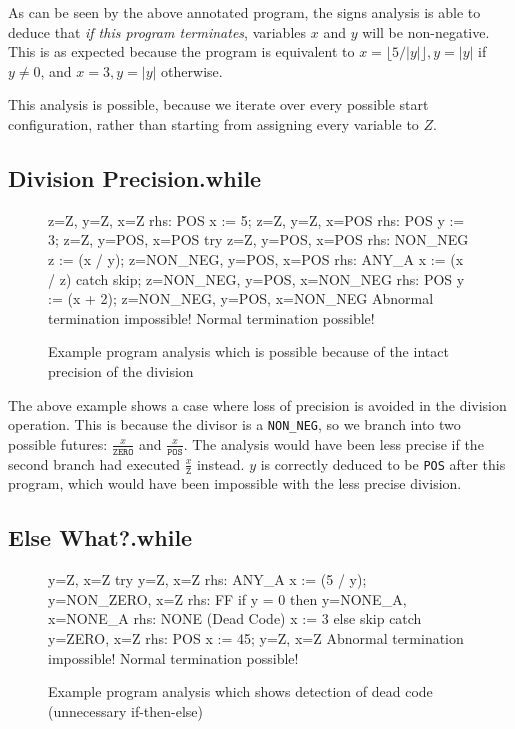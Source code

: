 \documentclass[a4paper,11pt]{article}
\begin{document}
As can be seen by the above annotated program,
the signs analysis is able to deduce that \emph{if this program terminates},
variables $x$ and $y$ will be non-negative. 
This is as expected because the program is equivalent to $x = \lfloor 5 / |y| \rfloor, y = |y|$ if $y \neq 0$,
and $x = 3, y = |y|$ otherwise.

This analysis is possible, because we iterate over every possible start configuration,
rather than starting from assigning every variable to $Z$.

\clearpage
\subsection{Division Precision.while}
\begin{figure}[h!]
\centering
\begin{verbatimtab}[4]
{z=Z, y=Z, x=Z} rhs: POS
x := 5;
{z=Z, y=Z, x=POS} rhs: POS
y := 3;
{z=Z, y=POS, x=POS}
try
    {z=Z, y=POS, x=POS} rhs: NON_NEG
    z := (x / y);
    {z=NON_NEG, y=POS, x=POS} rhs: ANY_A
    x := (x / z)
catch
    skip;
{z=NON_NEG, y=POS, x=NON_NEG} rhs: POS
y := (x + 2);
{z=NON_NEG, y=POS, x=NON_NEG}
Abnormal termination impossible!
Normal termination possible!
\end{verbatimtab}

\label{division_precision.while}
\caption{Example program analysis which is possible because of the intact precision of the division}
\end{figure}

The above example shows a case where loss of precision is avoided in the division operation.
This is because the divisor is a \verb|NON_NEG|, so we branch into two possible futures:
$\frac{x}{\texttt{ZERO}}$ and $\frac{x}{\texttt{POS}}$.
The analysis would have been less precise if the second branch had executed $\frac{x}{\texttt{Z}}$ instead.
$y$ is correctly deduced to be \verb|POS| after this program, which would have been impossible with the less precise division.

\clearpage
\subsection{Else What?.while}

\begin{figure}[h!]
\centering
\begin{verbatimtab}[4]
{y=Z, x=Z}
try
    {y=Z, x=Z} rhs: ANY_A
    x := (5 / y);
    {y=NON_ZERO, x=Z} rhs: FF
    if y = 0 then
        {y=NONE_A, x=NONE_A} rhs: NONE (Dead Code)
        x := 3
    else
        skip
catch
    {y=ZERO, x=Z} rhs: POS
    x := 45;
{y=Z, x=Z}
Abnormal termination impossible!
Normal termination possible!
\end{verbatimtab}

\label{waste_if.while}
\caption{Example program analysis which shows detection of dead code (unnecessary if-then-else)}
\end{figure}
\end{document}
